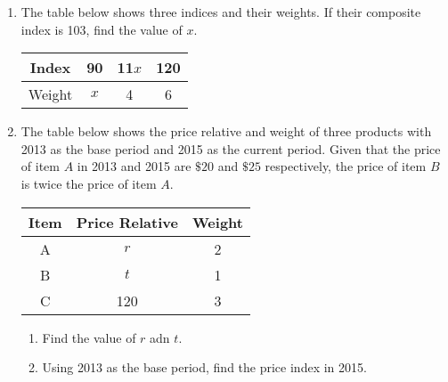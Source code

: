 \documentclass{report}
\begin{document}
\begin{multicols}{2}
\begin{enumerate}
    \item The table below shows three indices and their weights. If their composite index
          is 103, find the value of $x$.
          \begin{center}
            \begin{tabular}{|c|c|c|c|}
              \hline
              Index  & 90  & 11$x$ & 120 \\
              \hline
              Weight & $x$ & 4     & 6   \\
              \hline
            \end{tabular}
          \end{center}

    \item The table below shows the price relative and weight of three products with 2013
          as the base period and 2015 as the current period. Given that the price of item
          $A$ in 2013 and 2015 are $\$20$ and $\$25$ respectively, the price of item $B$
          is twice the price of item $A$.
          \begin{center}
            \begin{tabular}{|c|c|c|}
              \hline
              Item & Price Relative & Weight \\
              \hline
              A    & $r$            & 2      \\
              B    & $t$            & 1      \\
              C    & 120            & 3      \\
              \hline
            \end{tabular}
          \end{center}
          \begin{enumerate}
            \item Find the value of $r$ adn $t$.
            \item Using 2013 as the base period, find the price index in 2015.
          \end{enumerate}


\end{enumerate}
\end{multicols}
\end{document}
